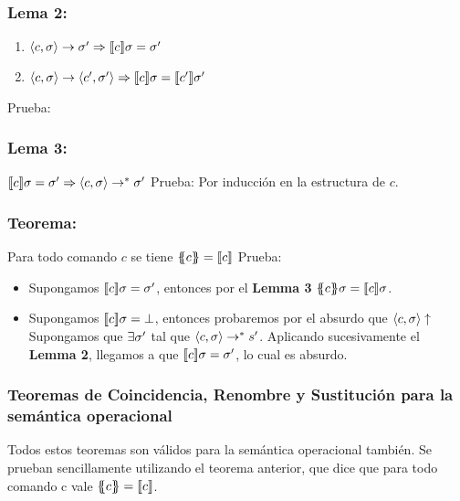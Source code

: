     \subsubsection*{\textbf{Lema 2:}}
      \begin{enumerate}
        \item $\langle c, \sigma\rangle \rightarrow \sigma' \Rightarrow \llbracket c\rrbracket \sigma = \sigma'$
        \item $\langle c, \sigma\rangle \rightarrow \langle c', \sigma'\rangle \Rightarrow \llbracket c\rrbracket \sigma = \llbracket c'\rrbracket\sigma'$
      \end{enumerate}
      \PN Prueba:

    \subsubsection*{\textbf{Lema 3:}} $\llbracket c\rrbracket \sigma = \sigma' \Rightarrow \langle c, \sigma\rangle \rightarrow^{\ast} \sigma'$
      \vspace{3mm}
      \PN Prueba: Por inducción en la estructura de $c$.

    \subsubsection*{\textbf{Teorema:}} Para todo comando $c$ se tiene $\{\!\!\{c\}\!\!\} = \llbracket c\rrbracket$
      \vspace{3mm}
      \PN Prueba:
        \begin{itemize}
          \item Supongamos $[\![c]\!]\sigma = \sigma'$, entonces por el \textbf{Lemma 3} $\{\!\!\{c\}\!\!\}\sigma = \llbracket c\rrbracket\sigma$.
          \item Supongamos $[\![c]\!]\sigma = \bot$, entonces probaremos por el absurdo que $\left\langle c, \sigma \right\rangle \uparrow$
            \PN Supongamos que $\exists \sigma'$ tal que $\left\langle c, \sigma \right\rangle \to^{\ast} s'$. Aplicando sucesivamente el \textbf{Lemma 2}, llegamos a que $[\![c]\!]\sigma = \sigma'$, lo cual es absurdo.
        \end{itemize}

    \subsubsection*{Teoremas de Coincidencia, Renombre y Sustitución para la semántica operacional}
      \PN Todos estos teoremas son válidos para la semántica operacional también. Se prueban sencillamente utilizando el teorema anterior, que dice que para todo comando c vale $\{\!\!\{c\}\!\!\} = \llbracket c\rrbracket$.